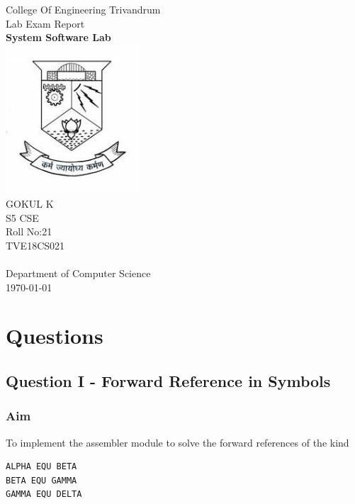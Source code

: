 \documentclass[13pt,oneside]{article}
\begin{document}

\begin{titlepage}
\begin{center}
{\LARGE College Of Engineering Trivandrum}\\[0.5cm]
{\LARGE Lab Exam Report}\\[2pt]
\linespread{1.2}\huge {\bfseries System Software Lab}\\[3cm]
\linespread{1}
\includegraphics[width=5cm]{img/emblem.jpeg}\\[3cm]
{\Large GOKUL K\\ S5  CSE \\ Roll No:21\\ TVE18CS021 }\\[1cm]


\textit{ }\\[2cm]
Department of Computer Science\\[0.2cm]
\today
\end{center}

\end{titlepage}

\newpage

\large
\section{Questions}
\subsection{Question I - Forward Reference in Symbols}
\subsubsection{Aim}
To implement the assembler module to solve the forward references of the kind
\begin{verbatim}
ALPHA EQU BETA
BETA EQU GAMMA
GAMMA EQU DELTA
\end{verbatim}
\end{document}
